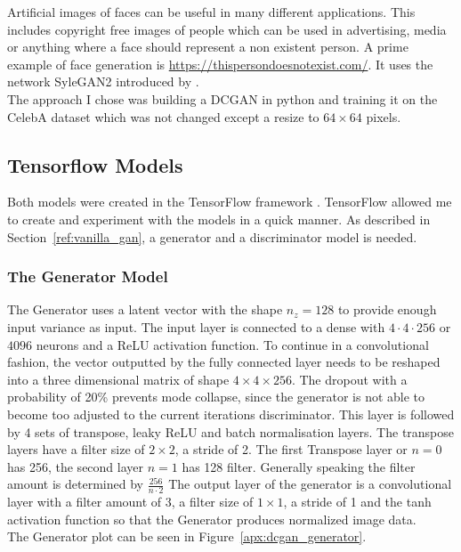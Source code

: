 Artificial images of faces can be useful in many different applications. This includes copyright free images of people which can be used in advertising, media or anything where a face should represent a non existent person. A prime example of face generation is \url{https://thispersondoesnotexist.com/}. It uses the network SyleGAN2 introduced by \citeauthor{karras_analyzing_2020} \autocite*{karras_analyzing_2020}.\\
The approach I chose was building a DCGAN in python and training it on the CelebA\autocite{liu2015faceattributes} dataset which was not changed except a resize to $64\times 64$ pixels. 
\newpage
\subsection{Tensorflow Models}
Both models were created in the TensorFlow framework \autocite{tensorflow2015-whitepaper}. TensorFlow allowed me to create and experiment with the models in a quick manner. As described in Section~\ref{ref:vanilla_gan}, a generator and a discriminator model is needed. 

\subsubsection{The Generator Model}
\label{ref:faces_dcgan_gen}
The Generator uses a latent vector with the shape $n_z=128$ to provide enough input variance as input. The input layer is connected to a \gls{dense} with $4 \cdot 4 \cdot 256$ or $4096$ neurons and a ReLU activation function. To continue in a convolutional fashion, the vector outputted by the fully connected layer needs to be reshaped into a three dimensional matrix of shape $4\times 4\times 256$. The \gls{dropout} with a probability of 20\% prevents mode collapse, since the generator is not able to become too adjusted to the current iterations discriminator.
This layer is followed by 4 sets of transpose, leaky ReLU and batch normalisation layers. The transpose layers have a filter size of $2\times 2$, a stride of 2. 
The first Transpose layer or $n=0$ has 256, the second layer $n=1$ has 128 filter. Generally speaking the filter amount is determined by $\frac{256}{n\cdot 2}$
The output layer of the generator is a convolutional layer with a filter amount of 3, a filter size of $1\times 1$, a stride of 1 and the tanh activation function so that the Generator produces normalized image data. \\
The Generator plot can be seen in Figure~\ref{apx:dcgan_generator}.

